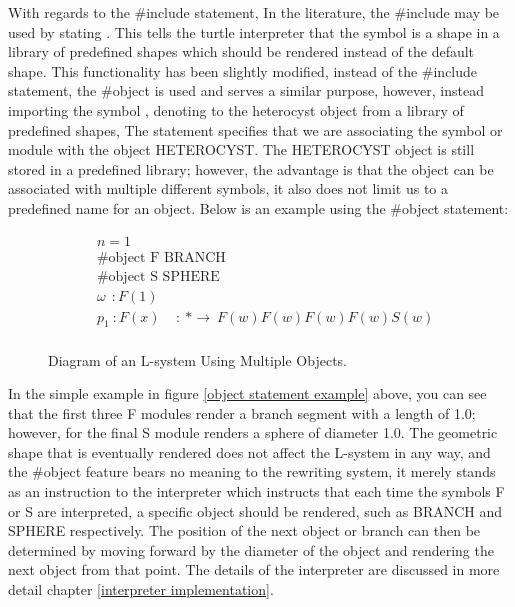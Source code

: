 With regards to the \#include statement, In the literature, the \#include may be used by stating . This tells the turtle interpreter that the symbol  is a shape in a library of predefined shapes which should be rendered instead of the default shape. This functionality has been slightly modified, instead of the \#include statement, the \#object is used and serves a similar purpose, however, instead importing the symbol , denoting to the heterocyst object from a library of predefined shapes, The statement  specifies that we are associating the symbol or module  with the object HETEROCYST. The HETEROCYST object is still stored in a predefined library; however, the advantage is that the object can be associated with multiple different symbols, it also does not limit us to a predefined name for an object. Below is an example using the \#object statement: 

\begin{equation} \label{object statement example}
\begin{aligned}
	&n=1 \\
	&\textrm{\#object F BRANCH}\\
	&\textrm{\#object S SPHERE}\\
	&\omega~~ : F(1)\\
	&p_1~ :  F(x)~~~~~ :~ * \rightarrow~ F(w)F(w)F(w)F(w)S(w)\\
\end{aligned}
\end{equation}

\begin{figure}[htbp]
	{\centering
		\vspace{7px}
		\setlength{\fboxrule}{1pt}
		\caption{Diagram of an L-system Using Multiple Objects.}
	}
\end{figure}
\FloatBarrier

\noindent
In the simple example in figure \ref{object statement example} above, you can see that the first three F modules render a branch segment with a length of 1.0; however, for the final S module renders a sphere of diameter 1.0. The geometric shape that is eventually rendered does not affect the L-system in any way, and the \#object feature bears no meaning to the rewriting system, it merely stands as an instruction to the interpreter which instructs that each time the symbols F or S are interpreted, a specific object should be rendered, such as BRANCH and SPHERE respectively. The position of the next object or branch can then be determined by moving forward by the diameter of the object and rendering the next object from that point. The details of the interpreter are discussed in more detail chapter \ref{interpreter implementation}.

